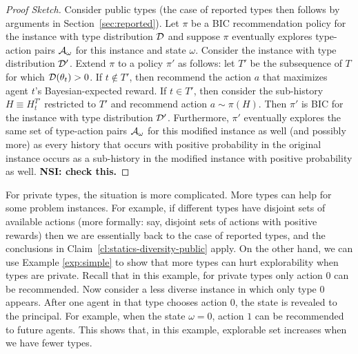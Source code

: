 \begin{proof}[Proof Sketch]
Consider public types (the case of reported types then follows by arguments in Section~\ref{sec:reported}).  Let $\pi$ be a BIC recommendation policy for the instance with type distribution $\mathcal{D}$ and suppose $\pi$ eventually explores type-action pairs $\mathcal{A}_{\omega}$ for this instance and state $\omega$.  Consider the instance with type distribution $\mathcal{D}'$.  Extend $\pi$ to a policy $\pi'$ as follows: let $T'$ be the subsequence of $T$ for which $\mathcal{D}(\theta_t)>0$. If $t\not\in T'$, then recommend the action $a$ that maximizes agent $t$'s Bayesian-expected reward.  If $t\in T'$, then consider the sub-history $H\equiv H^{T'}_t$ restricted to $T'$ and recommend action $a\sim\pi(H)$.  Then $\pi'$ is BIC for the instance with type distribution $\mathcal{D}'$. Furthermore, $\pi'$ eventually explores the same set of type-action pairs $\mathcal{A}_{\omega}$ for this modified instance as well (and possibly more) as every history that occurs with positive probability in the original instance occurs as a sub-history in the modified instance with positive probability as well.
{\bf NSI: check this.}
\end{proof}

For private types, the situation is more complicated. More types can help for some problem instances. For example, if different types have disjoint sets of available actions (more formally: say, disjoint sets of actions with positive rewards) then we are essentially back to the case of reported types, and the conclusions in Claim~\ref{cl:statics-diversity-public} apply. On the other hand, we can use Example \ref{exp:simple} to show that more types can hurt explorability when types are private. Recall that in this example, for private types only action 0 can be recommended. Now consider a less diverse instance in which only type 0 appears. After one agent in that type chooses action 0, the state is revealed to the principal. For example, when the state $\omega = 0$, action $1$ can be recommended to future agents. This shows that,  in this example, explorable set increases when we have fewer types. 
